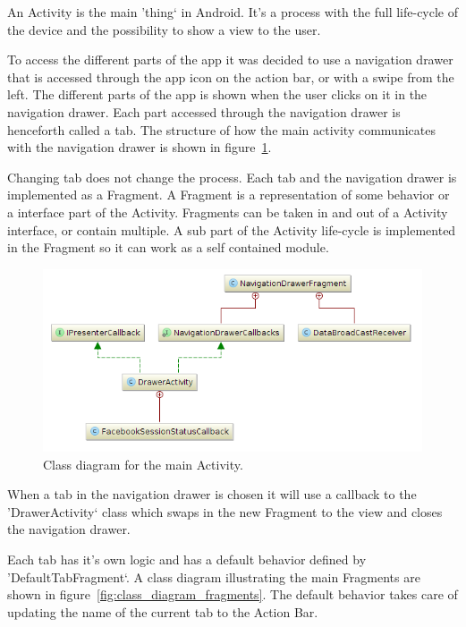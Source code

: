 An Activity is the main 'thing` in Android. It's a process with the full life-cycle of the device and the possibility to show a view to the user.

To access the different parts of the app it was decided to use a navigation drawer that is accessed through the app icon on the action bar, or with a swipe from the left. The different parts of the app is shown when the user clicks on it in the navigation drawer. Each part accessed through the navigation drawer is henceforth called a tab. The structure of how the main activity communicates with the navigation drawer is shown in figure~\ref{fig:class_diagram_drawer}.

Changing tab does not change the process. Each tab and the navigation drawer is implemented as a Fragment. A Fragment is a representation of some behavior or a interface part of the Activity. Fragments can be taken in and out of a Activity interface, or contain multiple. A sub part of the Activity life-cycle is implemented in the Fragment so it can work as a self contained module. 

\begin{figure}[H]
\includegraphics[width=\textwidth]{ch/architecture/fig/class_diagram_drawer.png}
\caption{Class diagram for the main Activity.}
\label{fig:class_diagram_drawer}
\end{figure}

When a tab in the navigation drawer is chosen it will use a callback to the 'DrawerActivity` class which swaps in the new Fragment to the view and closes the navigation drawer.

Each tab has it's own logic and has a default behavior defined by 'DefaultTabFragment`. A class diagram illustrating the main Fragments are shown in figure~\ref{fig:class_diagram_fragments}. The default behavior takes care of updating the name of the current tab to the Action Bar.

